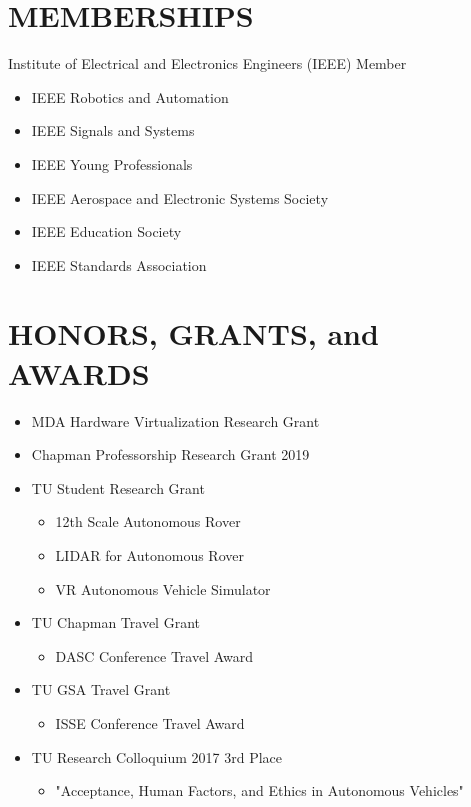 \documentclass[line]{res} %
\begin{document}
\begin{resume}
\section{MEMBERSHIPS}

\vspace{5pt} %

Institute of Electrical and Electronics Engineers (IEEE) Member
\begin{itemize}
\item IEEE Robotics and Automation
\item IEEE Signals and Systems
\item IEEE Young Professionals
\item IEEE Aerospace and Electronic Systems Society
\item IEEE Education Society
\item IEEE Standards Association
\end{itemize}

\vspace{0.2in} %

\section{HONORS, GRANTS, and AWARDS} 

\vspace{5pt} %

\begin{center}
\begin{itemize}
\item MDA Hardware Virtualization Research Grant
\item Chapman Professorship Research Grant 2019
\item TU Student Research Grant
\begin{itemize}
\item 12th Scale Autonomous Rover
\item LIDAR for Autonomous Rover
\item VR Autonomous Vehicle Simulator
\end{itemize}
\item TU Chapman Travel Grant
\begin{itemize}
\item DASC Conference Travel Award
\end{itemize}
\item TU GSA Travel Grant
\begin{itemize}
\item ISSE Conference Travel Award
\end{itemize}
\item TU Research Colloquium 2017 3rd Place
\begin{itemize}
\item "Acceptance, Human Factors, and Ethics in Autonomous Vehicles"
\end{itemize}


\end{itemize}
\end{center}
\end{resume}
\end{document}
